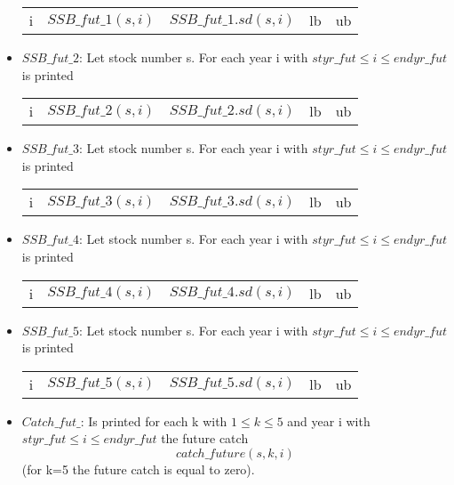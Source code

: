 \documentclass{article}
\begin{document}
\begin{itemize}
\begin{center}
    \begin{tabular}{c c c c c}
       i  & $SSB\_fut\_1(s,i)$ & $SSB\_fut\_1.sd(s,i)$ 
         & lb & ub \\
    \end{tabular}
\end{center}


\item $SSB\_fut\_2$: Let stock number s. For each year i with $styr\_fut \leq i \leq endyr\_fut$ is printed

\begin{center}
    \begin{tabular}{c c c c c}
       i  & $SSB\_fut\_2(s,i)$ & $SSB\_fut\_2.sd(s,i)$ 
         & lb & ub \\
    \end{tabular}
\end{center}


\item $SSB\_fut\_3$: Let stock number s. For each year i with $styr\_fut \leq i \leq endyr\_fut$ is printed

\begin{center}
    \begin{tabular}{c c c c c}
       i  & $SSB\_fut\_3(s,i)$ & $SSB\_fut\_3.sd(s,i)$ 
         & lb & ub \\
    \end{tabular}
\end{center}



\item $SSB\_fut\_4$: Let stock number s. For each year i with $styr\_fut \leq i \leq endyr\_fut$ is printed

\begin{center}
    \begin{tabular}{c c c c c}
       i  & $SSB\_fut\_4(s,i)$ & $SSB\_fut\_4.sd(s,i)$ 
         & lb & ub \\
    \end{tabular}
\end{center}




\item $SSB\_fut\_5$: Let stock number s. For each year i with $styr\_fut \leq i \leq endyr\_fut$ is printed

\begin{center}
    \begin{tabular}{c c c c c}
       i  & $SSB\_fut\_5(s,i)$ & $SSB\_fut\_5.sd(s,i)$ 
         & lb & ub \\
    \end{tabular}
\end{center}
\item $Catch\_fut\_$: Is printed for each k with $1\leq k \leq 5$ and year i with $styr\_fut \leq i \leq endyr\_fut$ the future catch
\begin{equation}
    catch\_future(s,k,i)
\end{equation}
(for k=5 the future catch is equal to zero).


\end{itemize}
\end{document}

